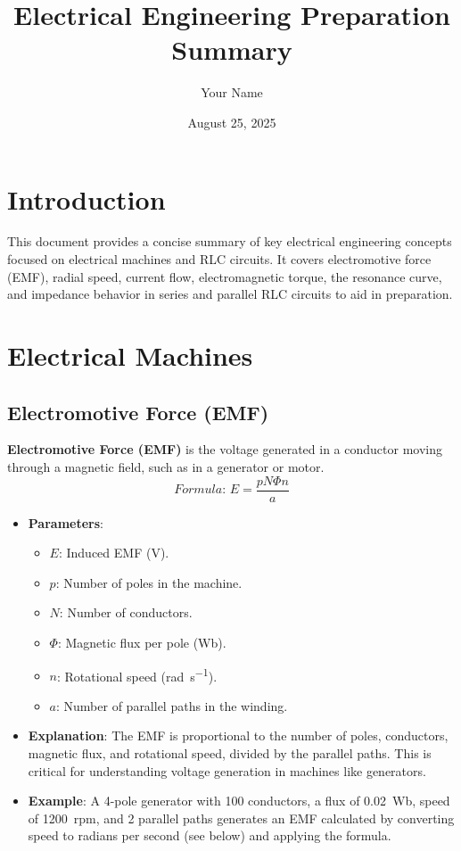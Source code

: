 \documentclass[12pt]{article}
\newcommand{\concept}[1]{\textbf{#1}}
\newcommand{\formula}[1]{\textit{Formula: }#1}
\begin{document}
\title{Electrical Engineering Preparation Summary}
\author{Your Name}
\date{August 25, 2025}
\maketitle

\tableofcontents
\newpage

\section{Introduction}
This document provides a concise summary of key electrical engineering concepts focused on electrical machines and RLC circuits. It covers electromotive force (EMF), radial speed, current flow, electromagnetic torque, the resonance curve, and impedance behavior in series and parallel RLC circuits to aid in preparation.

\section{Electrical Machines}
\subsection{Electromotive Force (EMF)}
\concept{Electromotive Force (EMF)} is the voltage generated in a conductor moving through a magnetic field, such as in a generator or motor.
\[
\formula{E = \frac{p N \Phi n}{a}}
\]
\begin{itemize}
    \item \textbf{Parameters}:
        \begin{itemize}
            \item \(E\): Induced EMF (\si{\volt}).
            \item \(p\): Number of poles in the machine.
            \item \(N\): Number of conductors.
            \item \(\Phi\): Magnetic flux per pole (\si{\weber}).
            \item \(n\): Rotational speed (\si{\radian\per\second}).
            \item \(a\): Number of parallel paths in the winding.
        \end{itemize}
    \item \textbf{Explanation}: The EMF is proportional to the number of poles, conductors, magnetic flux, and rotational speed, divided by the parallel paths. This is critical for understanding voltage generation in machines like generators.
    \item \textbf{Example}: A 4-pole generator with 100 conductors, a flux of \SI{0.02}{\weber}, speed of \SI{1200}{rpm}, and 2 parallel paths generates an EMF calculated by converting speed to radians per second (see below) and applying the formula.
\end{itemize}
\end{document}
